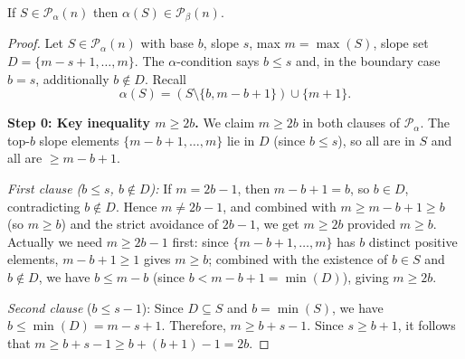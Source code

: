 \begin{lemma}\label{lemma:alpha-lands-in-beta}\leanok
 If $S\in \mathcal{P}_\alpha(n)$ then $\alpha (S)\in \mathcal{P}_\beta(n)$.
\end{lemma}
\begin{proof}\leanok
Let $S \in \mathcal{P}_\alpha(n)$ with base $b$, slope $s$, max $m = \max(S)$, slope set $D = \{m - s + 1, \ldots, m\}$. The $\alpha$-condition says $b \leq s$ and, in the boundary case $b = s$, additionally $b \notin D$. Recall
$$\alpha(S) = (S \setminus \{b, m - b + 1\}) \cup \{m + 1\}.$$

\textbf{Step 0: Key inequality $m \geq 2b$.}
We claim $m \geq 2b$ in both clauses of $\mathcal{P}_\alpha$. The top-$b$ slope elements $\{m - b + 1, \ldots, m\}$ lie in $D$ (since $b \leq s$), so all are in $S$ and all are $\geq m - b + 1$.

\emph{First clause ($b \leq s$, $b \notin D$):} If $m = 2b - 1$, then $m - b + 1 = b$, so $b \in D$, contradicting $b \notin D$. Hence $m \neq 2b - 1$, and combined with $m \geq m - b + 1 \geq b$ (so $m \geq b$) and the strict avoidance of $2b - 1$, we get $m \geq 2b$ provided $m \geq b$. Actually we need $m \geq 2b - 1$ first: since $\{m-b+1,\ldots,m\}$ has $b$ distinct positive elements, $m - b + 1 \geq 1$ gives $m \geq b$; combined with the existence of $b \in S$ and $b \notin D$, we have $b \leq m - b$ (since $b < m - b + 1 = \min(D)$), giving $m \geq 2b$.


\emph{Second clause} (\(b \leq s-1\)): Since \(D \subseteq S\) and \(b=\min(S)\), we have $b \leq \min(D)=m-s+1$.
Therefore, $m \geq b+s-1$. Since \(s \geq b+1\), it follows that $m \geq b+s-1 \geq b+(b+1)-1= 2b.$


\end{proof}
